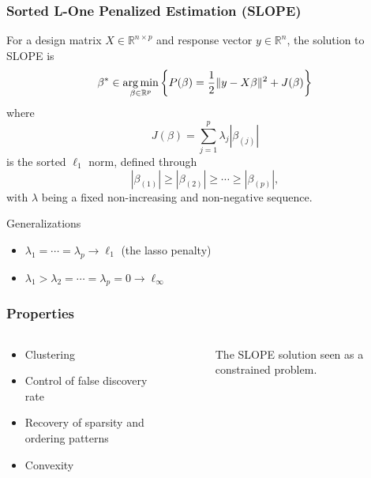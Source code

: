 \begin{frame}
  \frametitle{Sorted L-One Penalized Estimation (SLOPE)}

  For a design matrix \(X \in \mathbb{R}^{n \times p}\) and response vector \(y \in \mathbb{R}^n\), the solution to SLOPE is
  \[
    \beta^* \in \operatorname*{arg\,min}_{\beta \in \mathbb{R}^p}
    \left\{P(\beta) =  \frac{1}{2} \lVert {y - X \beta} \rVert^2 + J(\beta)\right\}
  \]
  where
  \begin{equation*}
    \label{eq:sorted-l1-norm}
    J(\beta) = \sum_{j=1}^p \lambda_j|\beta_{(j)}|
  \end{equation*}
  is the \alert{sorted \(\ell_1\) norm}, defined through
  \begin{equation}
    |\beta_{(1)}| \geq |\beta_{(2)}| \geq \cdots \geq |\beta_{(p)}|,
  \end{equation}
  with \(\lambda\) being a fixed non-increasing and non-negative sequence.

  \pause

  \begin{block}{Generalizations}
    \begin{itemize}
      \item \(\lambda_1 = \cdots = \lambda_p \rightarrow \ell_1\) (the lasso penalty)
      \item \(\lambda_1 > \lambda_2 = \cdots = \lambda_p = 0 \rightarrow \ell_\infty\)
    \end{itemize}
  \end{block}

\end{frame}

\begin{frame}[c]
  \frametitle{Properties}

  \begin{columns}
    \begin{column}{0.45\textwidth}
      \begin{itemize}
        \item \alert{Clustering}~\parencite{bogdan2022,schneider2020a,figueiredo2016}
        \item \alert{Control of false discovery rate}~\parencite{bogdan2013,bogdan2015}
        \item \alert{Recovery of sparsity and ordering patterns}~\parencite{bogdan2022}
        \item \alert{Convexity}
      \end{itemize}

    \end{column}
    \begin{column}{0.45\textwidth}
      \begin{figure}
        \centering
        \pgfplotsset{width=6cm,height=6cm}
        
        \caption{%
          The SLOPE solution seen as a constrained problem.
        }
        \label{fig:slope-solution}
      \end{figure}

    \end{column}
  \end{columns}

\end{frame}

